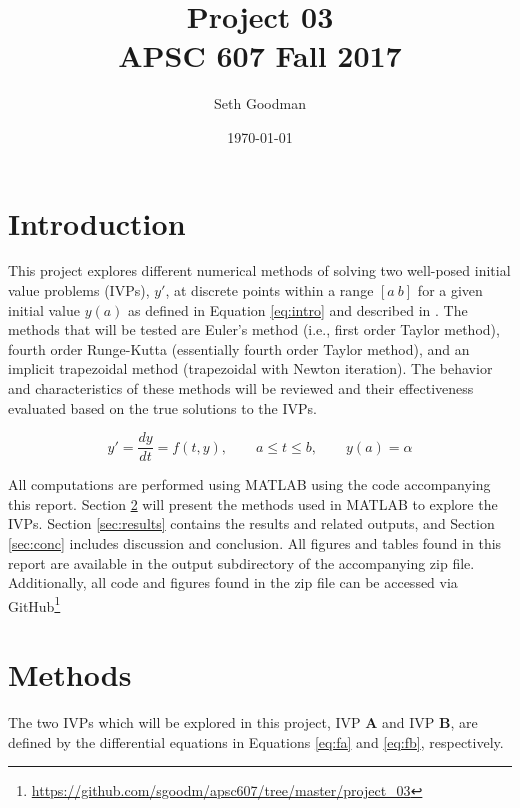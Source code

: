 \documentclass{article}
\title{
	Project 03 \\
	\bigskip
	\normalsize APSC 607 Fall 2017
}
\author{Seth Goodman}
\date{\today}
\begin{document}
\maketitle



\setlength{\abovedisplayskip}{1pt}
\setlength{\belowdisplayskip}{1pt}

\section{Introduction}
\label{sec:introduction}

This project explores different numerical methods of solving two well-posed initial value problems (IVPs), $y'$, at discrete points within a range $[a\ b]$ for a given initial value $y(a)$ as defined in Equation \ref{eq:intro} and described in \cite{burden2010}. The methods that will be tested are Euler's method (i.e., first order Taylor method), fourth order Runge-Kutta (essentially fourth order Taylor method), and an implicit trapezoidal method (trapezoidal with Newton iteration). The behavior and characteristics of these methods will be reviewed and their effectiveness evaluated based on the true solutions to the IVPs.

\begin{equation}
y' = \frac{dy}{dt} = f(t,y), \qquad a \leq t \leq b, \qquad  y(a) = \alpha
\label{eq:intro}
\end{equation}

All computations are performed using MATLAB using the code accompanying this report. Section \ref{sec:methods} will present the methods used in MATLAB to explore the IVPs. Section \ref{sec:results} contains the results and related outputs, and Section \ref{sec:conc} includes discussion and conclusion. All figures and tables found in this report are available in the output subdirectory of the accompanying zip file. Additionally, all code and figures found in the zip file can be accessed via GitHub\footnote{\url{https://github.com/sgoodm/apsc607/tree/master/project_03}}

\newpage
\section{Methods}
\label{sec:methods}

The two IVPs which will be explored in this project, IVP \textbf{A} and IVP \textbf{B}, are defined by the differential equations in Equations \ref{eq:fa} and \ref{eq:fb}, respectively.
\end{document}
